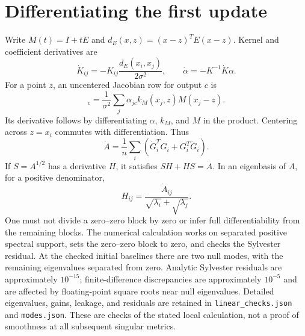 \documentclass[11pt]{article}
\begin{document}


\clearpage
\appendix
\section{Differentiating the first update}\label{app:derivatives}
Write $M(t)=I+tE$ and $d_E(x,z)=(x-z)^TE(x-z)$. Kernel and coefficient derivatives are
\begin{equation}
 \dot K_{ij}=-K_{ij}\frac{d_E(x_i,x_j)}{2\sigma^2},\qquad
 \dot\alpha=-K^{-1}\dot K\alpha .
\end{equation}
For a point $z$, an uncentered Jacobian row for output $c$ is
\begin{equation}
 [\nabla f_M(z)]_c=\frac1{\sigma^2}\sum_j\alpha_{jc}k_M(x_j,z)M(x_j-z).
\end{equation}
Its derivative follows by differentiating $\alpha$, $k_M$, and $M$ in the product. Centering across $z=x_i$ commutes with differentiation. Thus
\begin{equation}
 \dot A=\frac1n\sum_i(\dot G_i^TG_i+G_i^T\dot G_i).
\end{equation}
If $S=A^{1/2}$ has a derivative $H$, it satisfies $SH+HS=\dot A$. In an eigenbasis of $A$, for a positive denominator,
\begin{equation}
 H_{ij}=\frac{\dot A_{ij}}{\sqrt{\lambda_i}+\sqrt{\lambda_j}}.
\end{equation}
One must not divide a zero--zero block by zero or infer full differentiability from the remaining blocks. The numerical calculation works on separated positive spectral support, sets the zero--zero block to zero, and checks the Sylvester residual. At the checked initial baselines there are two null modes, with the remaining eigenvalues separated from zero. Analytic Sylvester residuals are approximately $10^{-15}$; finite-difference discrepancies are approximately $10^{-5}$ and are affected by floating-point square roots near null eigenvalues. Detailed eigenvalues, gains, leakage, and residuals are retained in \texttt{linear\_checks.json} and \texttt{modes.json}. These are checks of the stated local calculation, not a proof of smoothness at all subsequent singular metrics.
\end{document}
